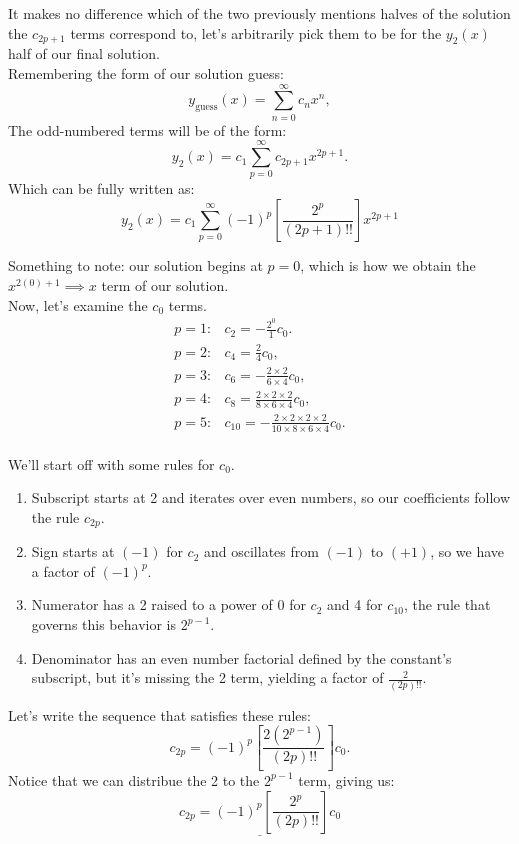 \documentclass[a4paper,12pt]{article} %
\begin{document}
 It makes no difference which of the two previously mentions halves of the solution the $c_{2p+1}$ terms correspond to, let's arbitrarily pick them to be for the $y_2(x)$ half of our final solution.\\

Remembering the form of our solution guess:
$$ y_{\text{guess}}(x) = \sum_{n=0}^{\infty} c_{n}x^n, $$
The odd-numbered terms will be of the form:
$$ y_2(x) = c_1 \sum_{p=0}^{\infty} c_{2p+1}x^{2p+1}. $$
Which can be fully written as:
$$ \boxed{y_2(x) = c_1\sum_{p=0}^{\infty} (-1)^p \left[\frac{2^p}{(2p+1)!!}\right]x^{2p+1}} $$

Something to note: our solution begins at $p=0$, which is how we obtain the $x^{2(0)+1} \implies x$ term of our solution.\\

Now, let's examine the $c_0$ terms.
$$
\begin{array}{rl}
p=1: & c_2 = -\frac{2^0}{1} c_0. \\
p=2: & c_4 = \frac{2}{4}c_0, \\
p=3: & c_6 = -\frac{2\times2}{6\times4}c_0, \\
p=4: & c_8 = \frac{2\times2\times2}{8\times6\times4}c_0, \\
p=5: & c_{10} = -\frac{2\times2\times2\times2}{10\times8\times6\times4}c_0. \\
\end{array}
$$

We'll start off with some rules for $c_0$.
\begin{enumerate}
	\item Subscript starts at 2 and iterates over even numbers, so our coefficients follow the rule $c_{2p}$.
	\item Sign starts at $(-1)$ for $c_2$ and oscillates from $(-1)$ to $(+1)$, so we have a factor of $(-1)^p$.
	\item Numerator has a 2 raised to a power of 0 for $c_2$ and 4 for $c_{10}$, the rule that governs this behavior is $2^{p-1}$.
	\item Denominator has an even number factorial defined by the constant's subscript, but it's missing the 2 term, yielding a factor of $\frac{2}{(2p)!!}$.
\end{enumerate}
Let's write the sequence that satisfies these rules:
$$ c_{2p} = (-1)^{p}\left[\frac{2\left(2^{p-1}\right)}{(2p)!!}\right]c_0.$$
Notice that we can distribue the 2 to the $2^{p-1}$ term, giving us:
$$ \underline{c_{2p} = (-1)^{p}\left[\frac{2^{p}}{(2p)!!}\right]c_0} $$
\end{document}
